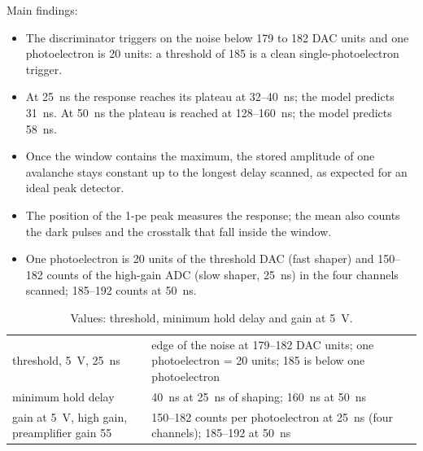 \documentclass[11pt,a4paper]{article}
\begin{document}
Main findings:
\begin{itemize}
\item The discriminator triggers on the noise below 179 to 182 DAC units and one photoelectron
  is 20 units: a threshold of 185 is a clean single-photoelectron trigger.
\item At 25~ns the response reaches its plateau at 32--40~ns; the model predicts 31~ns. At
  50~ns the plateau is reached at 128--160~ns; the model predicts 58~ns.
\item Once the window contains the maximum, the stored amplitude of one avalanche stays
  constant up to the longest delay scanned, as expected for an ideal peak detector.
\item The position of the 1-pe peak measures the response; the mean also counts the dark
  pulses and the crosstalk that fall inside the window.
\item One photoelectron is 20 units of the threshold DAC (fast shaper) and 150--182 counts
  of the high-gain ADC (slow shaper, 25~ns) in the four channels scanned; 185--192 counts at
  50~ns.
\end{itemize}

\begin{table}[H]
\centering
\small
\begin{tabular}{p{}p{}}
\toprule
threshold, 5~V, 25~ns & edge of the noise at 179--182 DAC units; one photoelectron = 20
  units; 185 is below one photoelectron \\
minimum hold delay & 40~ns at 25~ns of shaping; 160~ns at 50~ns \\
gain at 5~V, high gain, preamplifier gain 55 & 150--182 counts per photoelectron at 25~ns
  (four channels); 185--192 at 50~ns \\
\bottomrule
\end{tabular}
\caption{Values: threshold, minimum hold delay and gain at 5~V.}
\label{tab:values}
\end{table}
\end{document}
